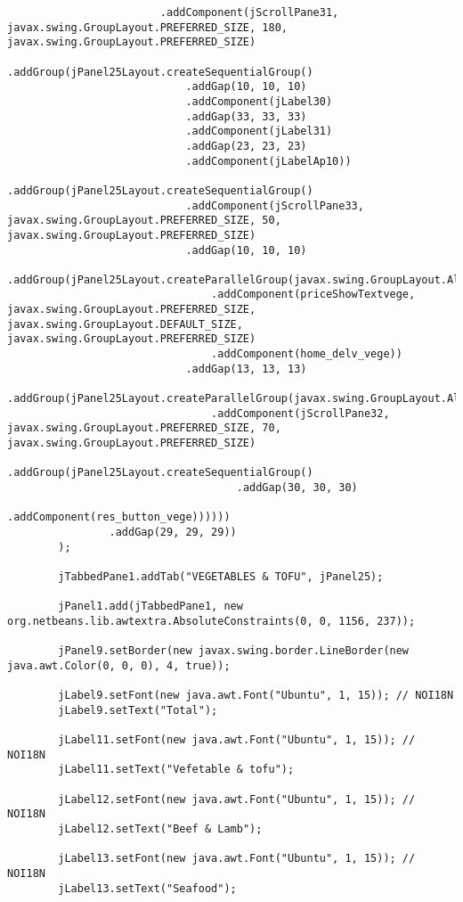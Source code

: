 \documentclass[12pt,a4paper]{article}
\begin{document}
\begin{lstlisting}
                        .addComponent(jScrollPane31, javax.swing.GroupLayout.PREFERRED_SIZE, 180, javax.swing.GroupLayout.PREFERRED_SIZE)
                        .addGroup(jPanel25Layout.createSequentialGroup()
                            .addGap(10, 10, 10)
                            .addComponent(jLabel30)
                            .addGap(33, 33, 33)
                            .addComponent(jLabel31)
                            .addGap(23, 23, 23)
                            .addComponent(jLabelAp10))
                        .addGroup(jPanel25Layout.createSequentialGroup()
                            .addComponent(jScrollPane33, javax.swing.GroupLayout.PREFERRED_SIZE, 50, javax.swing.GroupLayout.PREFERRED_SIZE)
                            .addGap(10, 10, 10)
                            .addGroup(jPanel25Layout.createParallelGroup(javax.swing.GroupLayout.Alignment.LEADING)
                                .addComponent(priceShowTextvege, javax.swing.GroupLayout.PREFERRED_SIZE, javax.swing.GroupLayout.DEFAULT_SIZE, javax.swing.GroupLayout.PREFERRED_SIZE)
                                .addComponent(home_delv_vege))
                            .addGap(13, 13, 13)
                            .addGroup(jPanel25Layout.createParallelGroup(javax.swing.GroupLayout.Alignment.LEADING)
                                .addComponent(jScrollPane32, javax.swing.GroupLayout.PREFERRED_SIZE, 70, javax.swing.GroupLayout.PREFERRED_SIZE)
                                .addGroup(jPanel25Layout.createSequentialGroup()
                                    .addGap(30, 30, 30)
                                    .addComponent(res_button_vege))))))
                .addGap(29, 29, 29))
        );

        jTabbedPane1.addTab("VEGETABLES & TOFU", jPanel25);

        jPanel1.add(jTabbedPane1, new org.netbeans.lib.awtextra.AbsoluteConstraints(0, 0, 1156, 237));

        jPanel9.setBorder(new javax.swing.border.LineBorder(new java.awt.Color(0, 0, 0), 4, true));

        jLabel9.setFont(new java.awt.Font("Ubuntu", 1, 15)); // NOI18N
        jLabel9.setText("Total");

        jLabel11.setFont(new java.awt.Font("Ubuntu", 1, 15)); // NOI18N
        jLabel11.setText("Vefetable & tofu");

        jLabel12.setFont(new java.awt.Font("Ubuntu", 1, 15)); // NOI18N
        jLabel12.setText("Beef & Lamb");

        jLabel13.setFont(new java.awt.Font("Ubuntu", 1, 15)); // NOI18N
        jLabel13.setText("Seafood");


\end{lstlisting}
\end{document}

